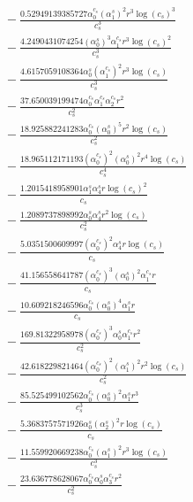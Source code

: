 \documentclass[10pt]{article}
\begin{document}
\begin{align*}
&{}  - \frac{0.52949139385727 \alpha_{0}^{c_s} \left(\alpha_{1}^s\right)^{2} r^{3} \log{\left(c_{s} \right)}^{3}}{c_{s}^{3}} \\
&{}  - \frac{4.2490431074254 \left(\alpha_{0}^s\right)^{3} \alpha_{1}^{c_s} r^{3} \log{\left(c_{s} \right)}^{2}}{c_{s}^{3}} \\
&{}  - \frac{4.6157059108364 \alpha_{0}^s \left(\alpha_{1}^{c_s}\right)^{2} r^{3} \log{\left(c_{s} \right)}}{c_{s}^{3}} \\
&{}  - \frac{37.650039199474 \alpha_{0}^{c_s} \alpha_{1}^{c_s} \alpha_{2}^{c_s} r^{2}}{c_{s}^{2}} \\
&{}  - \frac{18.925882241283 \alpha_{0}^{c_s} \left(\alpha_{0}^s\right)^{5} r^{2} \log{\left(c_{s} \right)}}{c_{s}^{2}} \\
&{}  - \frac{18.965112171193 \left(\alpha_{0}^{c_s}\right)^{2} \left(\alpha_{0}^s\right)^{2} r^{4} \log{\left(c_{s} \right)}}{c_{s}^{4}} \\
&{}  - \frac{1.2015418958901 \alpha_{1}^s \alpha_{4}^s r \log{\left(c_{s} \right)}^{2}}{c_{s}} \\
&{}  - \frac{1.2089737898992 \alpha_{0}^s \alpha_{4}^s r^{2} \log{\left(c_{s} \right)}}{c_{s}^{2}} \\
&{}  - \frac{5.0351500609997 \left(\alpha_{0}^{c_s}\right)^{2} \alpha_{4}^s r \log{\left(c_{s} \right)}}{c_{s}} \\
&{}  - \frac{41.156558641787 \left(\alpha_{0}^{c_s}\right)^{3} \left(\alpha_{0}^s\right)^{2} \alpha_{1}^{c_s} r}{c_{s}} \\
&{}  - \frac{10.609218246596 \alpha_{0}^{c_s} \left(\alpha_{0}^s\right)^{4} \alpha_{1}^s r}{c_{s}} \\
&{}  - \frac{169.81322958978 \left(\alpha_{0}^{c_s}\right)^{3} \alpha_{0}^s \alpha_{1}^{c_s} r^{2}}{c_{s}^{2}} \\
&{}  - \frac{42.618229821464 \left(\alpha_{0}^{c_s}\right)^{2} \left(\alpha_{1}^s\right)^{2} r^{2} \log{\left(c_{s} \right)}}{c_{s}^{2}} \\
&{}  - \frac{85.525499102562 \alpha_{0}^{c_s} \left(\alpha_{0}^s\right)^{2} \alpha_{1}^s r^{3}}{c_{s}^{3}} \\
&{}  - \frac{5.3683757571926 \alpha_{0}^s \left(\alpha_{2}^s\right)^{2} r \log{\left(c_{s} \right)}}{c_{s}} \\
&{}  - \frac{11.559920669238 \alpha_{0}^{c_s} \left(\alpha_{1}^s\right)^{2} r^{3} \log{\left(c_{s} \right)}}{c_{s}^{3}} \\
&{}  - \frac{23.636778628067 \alpha_{0}^{c_s} \alpha_{0}^s \alpha_{3}^{c_s} r^{2}}{c_{s}^{2}} \\

\end{align*}
\end{document}
